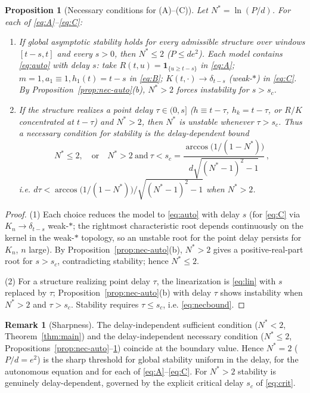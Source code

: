 \documentclass[12pt]{article}
\newtheorem{proposition}{Proposition}
\theoremstyle{definition}
\newtheorem{remark}{Remark}
\begin{document}
\begin{proposition}[Necessary conditions for (A)--(C)]\label{prop:nec-nonauto}
Let $N^*=\ln(P/d)$. For each of \eqref{eq:A}--\eqref{eq:C}:
\begin{enumerate}
\item[\rm(1)] If global asymptotic stability holds for \emph{every} admissible
structure over windows $[t-s,t]$ and every $s>0$, then $N^*\le2$
($P\le de^2$). Each model contains \eqref{eq:auto} with delay $s$:
take $R(t,u)=\mathbf1_{\{u\ge t-s\}}$ in \eqref{eq:A}; $m=1,a_1\equiv1,
h_1(t)=t-s$ in \eqref{eq:B}; $K(t,\cdot)\to\delta_{t-s}$ (weak-$*$) in
\eqref{eq:C}. By Proposition~\ref{prop:nec-auto}(b), $N^*>2$ forces instability
for $s>s_c$.
\item[\rm(2)] If the structure realizes a point delay $\tau\in(0,s]$
($h\equiv t-\tau$, $h_k=t-\tau$, or $R/K$ concentrated at $t-\tau$) and
$N^*>2$, then $N^*$ is unstable whenever $\tau>s_c$. Thus a necessary condition
for stability is the delay-dependent bound
\begin{equation}\label{eq:necbound}
  N^*\le2,\quad\text{or}\quad
  N^*>2\ \text{and}\ \tau<s_c
  =\frac{\arccos\!\bigl(1/(1-N^*)\bigr)}{d\sqrt{(N^*-1)^2-1}}\,,
\end{equation}
i.e. $d\tau<\arccos\!\bigl(1/(1-N^*)\bigr)/\sqrt{(N^*-1)^2-1}$ when $N^*>2$.
\end{enumerate}
\end{proposition}

\begin{proof}
(1) Each choice reduces the model to \eqref{eq:auto} with delay $s$ (for
\eqref{eq:C} via $K_n\to\delta_{t-s}$ weak-$*$; the rightmost characteristic
root depends continuously on the kernel in the weak-$*$ topology, so an unstable
root for the point delay persists for $K_n$, $n$ large). By
Proposition~\ref{prop:nec-auto}(b), $N^*>2$ gives a positive-real-part root for
$s>s_c$, contradicting stability; hence $N^*\le2$.

(2) For a structure realizing point delay $\tau$, the linearization is
\eqref{eq:lin} with $s$ replaced by $\tau$; Proposition~\ref{prop:nec-auto}(b)
with delay $\tau$ shows instability when $N^*>2$ and $\tau>s_c$. Stability
requires $\tau\le s_c$, i.e. \eqref{eq:necbound}.
\end{proof}

\begin{remark}[Sharpness]
The delay-independent sufficient condition ($N^*<2$,
Theorem~\ref{thm:main}) and the delay-independent necessary condition
($N^*\le2$, Propositions~\ref{prop:nec-auto}--\ref{prop:nec-nonauto}) coincide
at the boundary value. Hence $N^*=2$ ($P/d=e^2$) is the sharp threshold for
global stability uniform in the delay, for the autonomous equation and for each
of \eqref{eq:A}--\eqref{eq:C}. For $N^*>2$ stability is genuinely
delay-dependent, governed by the explicit critical delay $s_c$ of
\eqref{eq:crit}.
\end{remark}
\end{document}
